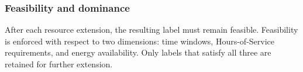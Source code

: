 \documentclass[3p,11pt,authoryear]{elsarticle}  %
\begin{document}

\subsubsection{Feasibility and dominance}

After each resource extension, the resulting label must remain feasible. Feasibility is enforced with respect to two dimensions: time windows, Hours-of-Service requirements, and energy availability. Only labels that satisfy all three are retained for further extension.
\end{document}
